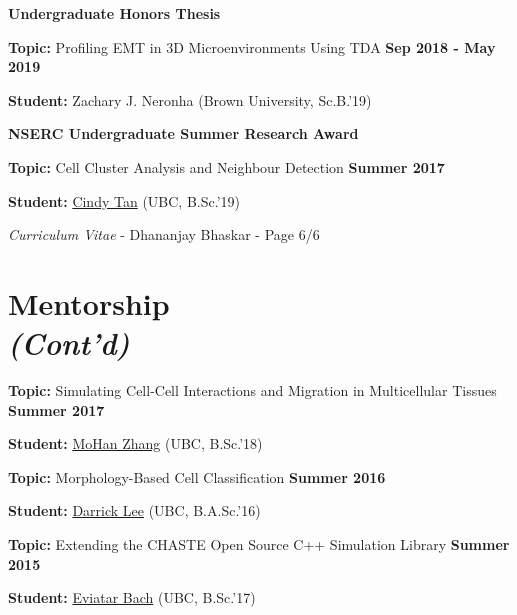 \documentclass[margin,line]{res}
\newenvironment{list1}{
  \begin{list}{\ding{113}}{
      \setlength{\itemsep}{0in}
      \setlength{\parsep}{0in} \setlength{\parskip}{0in}
      \setlength{\topsep}{0in} \setlength{\partopsep}{0in}
      \setlength{\leftmargin}{0.17in}}}{\end{list}}
\begin{document}
\begin{resume}
{\bf Undergraduate Honors Thesis}
\vspace*{.3cm}
\begin{list1}
\setlength\itemsep{0.2em}
\item[] {\bf Topic:} Profiling EMT in 3D Microenvironments Using TDA \hfill {\bf Sep 2018 - May 2019}
\item[] {\bf Student:} Zachary J. Neronha (Brown University, Sc.B.'19) 
\end{list1}

{\bf NSERC Undergraduate Summer Research Award}
\vspace*{.3cm}
\begin{list1}
\setlength\itemsep{0.2em}
\item[] {\bf Topic:} Cell Cluster Analysis and Neighbour Detection \hfill {\bf Summer 2017}
\item[] {\bf Student:} \href{https://ca.linkedin.com/in/csxtan}{Cindy Tan} (UBC, B.Sc.'19) 
\end{list1}

\newpage
\begin{flushright}
\textit{Curriculum Vitae} - Dhananjay Bhaskar - Page 6/6
\end{flushright}
\vspace*{.02cm}

\section{\sc Mentorship\\\textit{(Cont'd)}}

\begin{list1}
\setlength\itemsep{0.2em}
\item[] {\bf Topic:} Simulating Cell-Cell Interactions and Migration in Multicellular Tissues \hfill {\bf Summer 2017}
\item[] {\bf Student:} \href{https://ca.linkedin.com/in/mohan-zhang}{MoHan Zhang} (UBC, B.Sc.'18)
\end{list1}
\vspace*{.3cm}
\begin{list1}
\setlength\itemsep{0.2em}
\item[] {\bf Topic:} Morphology-Based Cell Classification \hfill {\bf Summer 2016}
\item[] {\bf Student:} \href{https://www.math.upenn.edu/~ldarrick/}{Darrick Lee} (UBC, B.A.Sc.'16)
\end{list1}
\vspace*{.3cm}
\begin{list1}
\setlength\itemsep{0.2em}
\item[] {\bf Topic:} Extending the CHASTE Open Source C++ Simulation Library \hfill {\bf Summer 2015}
\item[] {\bf Student:} \href{http://eviatarbach.com/}{Eviatar Bach} (UBC, B.Sc.'17)
\end{list1}


\end{resume}
\end{document}

